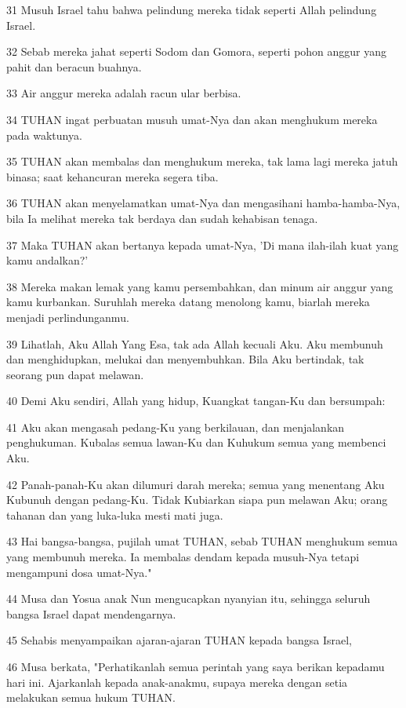 \par 31 Musuh Israel tahu bahwa pelindung mereka tidak seperti Allah pelindung Israel.
\par 32 Sebab mereka jahat seperti Sodom dan Gomora, seperti pohon anggur yang pahit dan beracun buahnya.
\par 33 Air anggur mereka adalah racun ular berbisa.
\par 34 TUHAN ingat perbuatan musuh umat-Nya dan akan menghukum mereka pada waktunya.
\par 35 TUHAN akan membalas dan menghukum mereka, tak lama lagi mereka jatuh binasa; saat kehancuran mereka segera tiba.
\par 36 TUHAN akan menyelamatkan umat-Nya dan mengasihani hamba-hamba-Nya, bila Ia melihat mereka tak berdaya dan sudah kehabisan tenaga.
\par 37 Maka TUHAN akan bertanya kepada umat-Nya, 'Di mana ilah-ilah kuat yang kamu andalkan?'
\par 38 Mereka makan lemak yang kamu persembahkan, dan minum air anggur yang kamu kurbankan. Suruhlah mereka datang menolong kamu, biarlah mereka menjadi perlindunganmu.
\par 39 Lihatlah, Aku Allah Yang Esa, tak ada Allah kecuali Aku. Aku membunuh dan menghidupkan, melukai dan menyembuhkan. Bila Aku bertindak, tak seorang pun dapat melawan.
\par 40 Demi Aku sendiri, Allah yang hidup, Kuangkat tangan-Ku dan bersumpah:
\par 41 Aku akan mengasah pedang-Ku yang berkilauan, dan menjalankan penghukuman. Kubalas semua lawan-Ku dan Kuhukum semua yang membenci Aku.
\par 42 Panah-panah-Ku akan dilumuri darah mereka; semua yang menentang Aku Kubunuh dengan pedang-Ku. Tidak Kubiarkan siapa pun melawan Aku; orang tahanan dan yang luka-luka mesti mati juga.
\par 43 Hai bangsa-bangsa, pujilah umat TUHAN, sebab TUHAN menghukum semua yang membunuh mereka. Ia membalas dendam kepada musuh-Nya tetapi mengampuni dosa umat-Nya."
\par 44 Musa dan Yosua anak Nun mengucapkan nyanyian itu, sehingga seluruh bangsa Israel dapat mendengarnya.
\par 45 Sehabis menyampaikan ajaran-ajaran TUHAN kepada bangsa Israel,
\par 46 Musa berkata, "Perhatikanlah semua perintah yang saya berikan kepadamu hari ini. Ajarkanlah kepada anak-anakmu, supaya mereka dengan setia melakukan semua hukum TUHAN.
